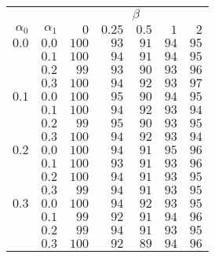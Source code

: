 \begin{tabular}{rr|rrrrr}
\hline\hline
 && \multicolumn{5}{c}{$\beta$}\\
 $\alpha_0$ & $\alpha_1$ & $0$ & $0.25$ & $0.5$ & $1$ & $2$ \\ 
 \hline
$0.0$ & $0.0$ & $100$ & $93$ & $91$ & $94$ & $95$\\ 
 & $0.1$ & $100$ & $94$ & $91$ & $94$ & $95$\\ 
 & $0.2$ & $99$ & $93$ & $90$ & $93$ & $96$\\ 
 & $0.3$ & $100$ & $94$ & $92$ & $93$ & $97$\\ 
\hline 
 $0.1$ & $0.0$ & $100$ & $95$ & $90$ & $94$ & $95$\\ 
 & $0.1$ & $100$ & $94$ & $92$ & $93$ & $94$\\ 
 & $0.2$ & $99$ & $95$ & $90$ & $93$ & $95$\\ 
 & $0.3$ & $100$ & $94$ & $92$ & $93$ & $94$\\ 
\hline 
 $0.2$ & $0.0$ & $100$ & $94$ & $91$ & $95$ & $96$\\ 
 & $0.1$ & $100$ & $93$ & $91$ & $93$ & $96$\\ 
 & $0.2$ & $100$ & $94$ & $91$ & $93$ & $95$\\ 
 & $0.3$ & $99$ & $94$ & $91$ & $93$ & $95$\\ 
\hline 
 $0.3$ & $0.0$ & $100$ & $94$ & $92$ & $93$ & $95$\\ 
 & $0.1$ & $99$ & $92$ & $91$ & $94$ & $96$\\ 
 & $0.2$ & $99$ & $94$ & $91$ & $93$ & $95$\\ 
 & $0.3$ & $100$ & $92$ & $89$ & $94$ & $96$\\ 
 \hline 
 \end{tabular}